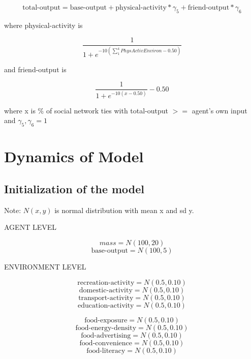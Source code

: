 \documentclass[12pt]{article}
\begin{document}
\begin{equation}
\text{total-output} = \text{base-output} + \text{physical-activity}*\gamma_5 + \text{friend-output}*\gamma_6
\end{equation}

where  physical-activity is

\begin{equation}
\frac{1}{1 + e^{-10(\sum_{1}^{4}PhysActivEnviron - 0.50)}}
\end{equation}

and friend-output is

\begin{equation}
\frac{1}{1 + e^{-10(x - 0.50)}} - 0.50
\end{equation}


where x is \% of social network ties with total-output $>=$ agent's own input and $\gamma_5, \gamma_6 = 1$


\section{Dynamics of Model}

\subsection{Initialization of the model}

Note: $N(x,y)$ is normal distribution with mean x and sd y.

AGENT LEVEL

$$ mass = N(100, 20)$$
$$ \text{base-output} = N(100, 5)$$

ENVIRONMENT LEVEL

$$ \text{recreation-activity} = N(0.5, 0.10) $$
$$ \text{domestic-activity} = N(0.5, 0.10) $$
$$ \text{transport-activity} = N(0.5, 0.10) $$
$$ \text{education-activity} = N(0.5, 0.10) $$

$$ \text{food-exposure} = N(0.5, 0.10) $$
$$ \text{food-energy-density} = N(0.5, 0.10) $$
$$ \text{food-advertising} = N(0.5, 0.10) $$
$$ \text{food-convenience} = N(0.5, 0.10) $$
$$ \text{food-literacy} = N(0.5, 0.10) $$
\end{document}
